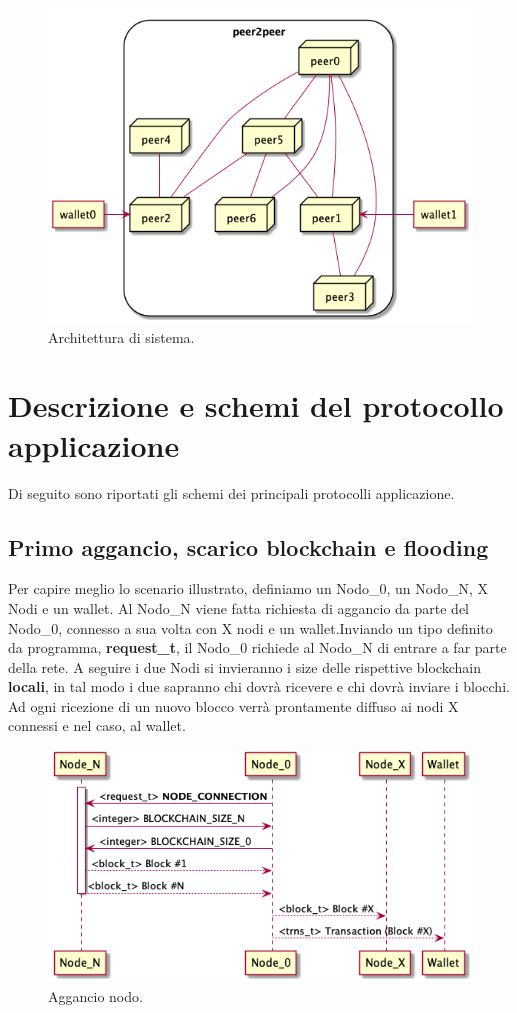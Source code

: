 \documentclass[a4paper,10pt]{report}
\begin{document}
  \begin{figure}[H]
  \center\includegraphics[scale=0.50]{arch.png}
  \caption{Architettura di sistema.}
  \end{figure}

  \chapter{Descrizione e schemi del protocollo applicazione}
  Di seguito sono riportati gli schemi dei principali protocolli applicazione.
  \section{Primo aggancio, scarico blockchain e flooding}
Per capire meglio lo scenario illustrato, definiamo un Nodo\_0, un Nodo\_N, X Nodi e un wallet. Al Nodo\_N viene fatta richiesta di aggancio da parte del Nodo\_0, connesso a sua volta con X nodi e un wallet.\newline Inviando un tipo definito da programma, \textbf{request\_t}, il Nodo\_0 richiede al Nodo\_N di entrare a far parte della rete. A seguire i due Nodi si invieranno i size delle rispettive blockchain \textbf{locali}, in tal modo i due sapranno chi dovrà ricevere e chi dovrà inviare i blocchi. Ad ogni ricezione di un nuovo blocco verrà prontamente diffuso ai nodi X connessi e nel caso, al wallet.
  \begin{figure}[H]
  \center\includegraphics[scale=0.40]{hookpeer.png}
  \caption{Aggancio nodo.}
  \end{figure}
	\newpage
\end{document}
